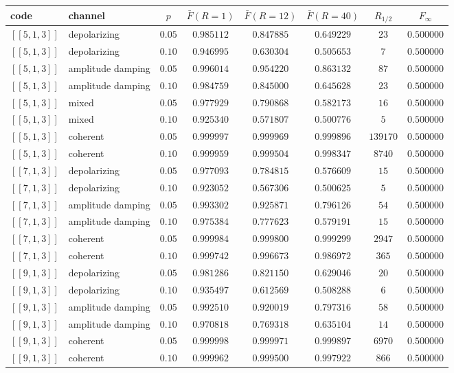 \documentclass[10pt,a4paper]{article}
\begin{document}
\begin{longtable}{llcccccc}
\toprule code & channel & $p$ & $\bar F(R{=}1)$ & $\bar F(R{=}12)$ & $\bar F(R{=}40)$ & $R_{1/2}$ & $F_\infty$ \\ \midrule
$[\![5,1,3]\!]$ & depolarizing & $0.05$ & $0.985112$ & $0.847885$ & $0.649229$ & $23$ & $0.500000$ \\
$[\![5,1,3]\!]$ & depolarizing & $0.10$ & $0.946995$ & $0.630304$ & $0.505653$ & $7$ & $0.500000$ \\
$[\![5,1,3]\!]$ & amplitude damping & $0.05$ & $0.996014$ & $0.954220$ & $0.863132$ & $87$ & $0.500000$ \\
$[\![5,1,3]\!]$ & amplitude damping & $0.10$ & $0.984759$ & $0.845000$ & $0.645628$ & $23$ & $0.500000$ \\
$[\![5,1,3]\!]$ & mixed & $0.05$ & $0.977929$ & $0.790868$ & $0.582173$ & $16$ & $0.500000$ \\
$[\![5,1,3]\!]$ & mixed & $0.10$ & $0.925340$ & $0.571807$ & $0.500776$ & $5$ & $0.500000$ \\
$[\![5,1,3]\!]$ & coherent & $0.05$ & $0.999997$ & $0.999969$ & $0.999896$ & $139170$ & $0.500000$ \\
$[\![5,1,3]\!]$ & coherent & $0.10$ & $0.999959$ & $0.999504$ & $0.998347$ & $8740$ & $0.500000$ \\
$[\![7,1,3]\!]$ & depolarizing & $0.05$ & $0.977093$ & $0.784815$ & $0.576609$ & $15$ & $0.500000$ \\
$[\![7,1,3]\!]$ & depolarizing & $0.10$ & $0.923052$ & $0.567306$ & $0.500625$ & $5$ & $0.500000$ \\
$[\![7,1,3]\!]$ & amplitude damping & $0.05$ & $0.993302$ & $0.925871$ & $0.796126$ & $54$ & $0.500000$ \\
$[\![7,1,3]\!]$ & amplitude damping & $0.10$ & $0.975384$ & $0.777623$ & $0.579191$ & $15$ & $0.500000$ \\
$[\![7,1,3]\!]$ & coherent & $0.05$ & $0.999984$ & $0.999800$ & $0.999299$ & $2947$ & $0.500000$ \\
$[\![7,1,3]\!]$ & coherent & $0.10$ & $0.999742$ & $0.996673$ & $0.986972$ & $365$ & $0.500000$ \\
$[\![9,1,3]\!]$ & depolarizing & $0.05$ & $0.981286$ & $0.821150$ & $0.629046$ & $20$ & $0.500000$ \\
$[\![9,1,3]\!]$ & depolarizing & $0.10$ & $0.935497$ & $0.612569$ & $0.508288$ & $6$ & $0.500000$ \\
$[\![9,1,3]\!]$ & amplitude damping & $0.05$ & $0.992510$ & $0.920019$ & $0.797316$ & $58$ & $0.500000$ \\
$[\![9,1,3]\!]$ & amplitude damping & $0.10$ & $0.970818$ & $0.769318$ & $0.635104$ & $14$ & $0.500000$ \\
$[\![9,1,3]\!]$ & coherent & $0.05$ & $0.999998$ & $0.999971$ & $0.999897$ & $6970$ & $0.500000$ \\
$[\![9,1,3]\!]$ & coherent & $0.10$ & $0.999962$ & $0.999500$ & $0.997922$ & $866$ & $0.500000$ \\
\bottomrule\end{longtable}
\end{document}
